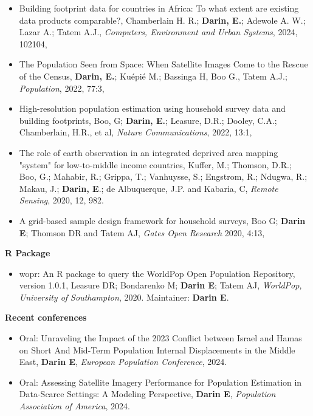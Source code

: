 \documentclass[
]{friggeri-cv}
\begin{document}
\begin{noside}
\begin{itemize}
\item Building footprint data for countries in Africa: To what extent are existing data products comparable?, Chamberlain H. R.; \textbf{Darin, E.}; Adewole A. W.; Lazar A.; Tatem A.J., \textit{Computers, Environment and Urban Systems}, 2024, 102104, \href{https://doi.org/10.1016/j.compenvurbsys.2024.102104}{\scriptsize{}}
\item The Population Seen from Space: When Satellite Images Come to the Rescue of the Census, \textbf{Darin, E.}; Kuépié M.; Bassinga H, Boo G., Tatem A.J.; \textit{Population}, 2022, 77:3, \href{https://doi.org/10.3917/popu.2203.0467}{\scriptsize{}}
\item High-resolution population estimation using household survey data and building footprints, Boo, G; \textbf{Darin, E.}; Leasure, D.R.; Dooley, C.A.; Chamberlain, H.R., et al, \textit{Nature Communications}, 2022, 13:1,    \href{https://www.nature.com/articles/s41467-022-29094-x}{\scriptsize{}}
\item The role of earth observation in an integrated deprived area mapping "system" for low-to-middle income countries, Kuffer, M.; Thomson, D.R.; Boo, G.; Mahabir, R.; Grippa, T.; Vanhuysse, S.; Engstrom, R.; Ndugwa, R.; Makau, J.; \textbf{Darin, E}.; de Albuquerque, J.P. and Kabaria, C, \textit{Remote Sensing}, 2020, 12, 982.    \href{https://www.mdpi.com/2072-4292/12/6/982}{\scriptsize{}} 
\item A grid-based sample design framework for household surveys, Boo G; \textbf{Darin E}; Thomson DR and Tatem AJ, \textit{Gates Open Research} 2020, 4:13, \href{https://gatesopenresearch.org/articles/4-13/v1}{\scriptsize{}}

\end{itemize}

\textbf{R Package}
\begin{itemize}
\item wopr: An R package to query the WorldPop Open Population Repository, version 1.0.1, Leasure DR; Bondarenko M; \textbf{Darin E}; Tatem AJ, \textit{WorldPop, University of Southampton}, 2020. Maintainer: \textbf{Darin E}. \href{https://apps.worldpop.org/woprVision/}{\scriptsize{}}
\end{itemize}

\textbf{Recent conferences}
\begin{itemize}
\item Oral: Unraveling the Impact of the 2023 Conflict between Israel and Hamas on Short And Mid-Term Population Internal Displacements in the Middle East, \textbf{Darin E}, \textit{European Population Conference}, 2024.
\item Oral: Assessing Satellite Imagery Performance for Population Estimation in Data-Scarce Settings: A Modeling Perspective, \textbf{Darin E}, \textit{Population Association of America}, 2024.


\end{itemize}
\end{noside}
\end{document}
